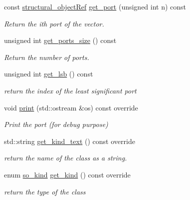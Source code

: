 \begin{DoxyCompactItemize}
const \hyperlink{structural__objects_8hpp_a8ea5f8cc50ab8f4c31e2751074ff60b2}{structural\+\_\+object\+Ref} \hyperlink{structport__o_a7dda79b07635ab1129af2b1f10bc5890}{get\+\_\+port} (unsigned int n) const
\begin{DoxyCompactList}\small\item\em Return the ith port of the vector. \end{DoxyCompactList}\item 
unsigned int \hyperlink{structport__o_a7b0bbdeec34d5d326f84af405c0d1024}{get\+\_\+ports\+\_\+size} () const
\begin{DoxyCompactList}\small\item\em Return the number of ports. \end{DoxyCompactList}\item 
unsigned int \hyperlink{structport__o_a00a38d69b196805ff8d058885deece37}{get\+\_\+lsb} () const
\begin{DoxyCompactList}\small\item\em return the index of the least significant port \end{DoxyCompactList}\item 
void \hyperlink{structport__o_a6a9748c4dc715b164cd1cb8f9d34ef80}{print} (std\+::ostream \&os) const override
\begin{DoxyCompactList}\small\item\em Print the port (for debug purpose) \end{DoxyCompactList}\item 
std\+::string \hyperlink{structport__o_aa3aee3f5227b20c9a1175ae5875e90bf}{get\+\_\+kind\+\_\+text} () const override
\begin{DoxyCompactList}\small\item\em return the name of the class as a string. \end{DoxyCompactList}\item 
enum \hyperlink{structural__objects_8hpp_acf52399aecacb7952e414c5746ce6439}{so\+\_\+kind} \hyperlink{structport__o_ab52b545359c3b6c24236f5328a49b3c5}{get\+\_\+kind} () const override
\begin{DoxyCompactList}\small\item\em return the type of the class \end{DoxyCompactList}\end{DoxyCompactItemize}
